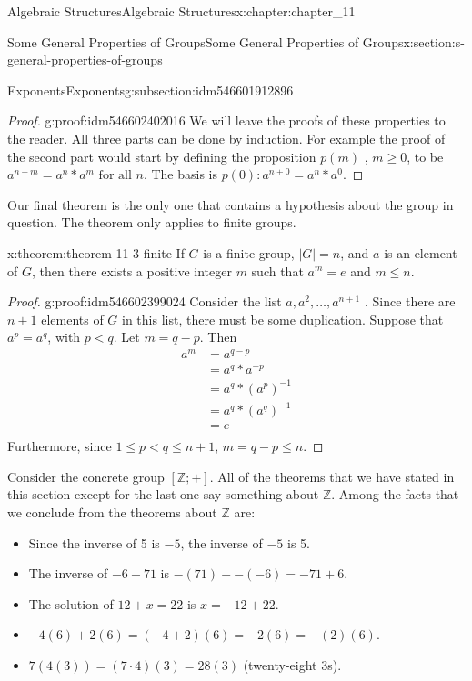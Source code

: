 \documentclass[oneside,10pt,]{book}
\numberwithin{equation}{section}
\begin{document}
\begin{chapterptx}{Algebraic Structures}{}{Algebraic Structures}{}{}{x:chapter:chapter_11}
\begin{sectionptx}{Some General Properties of Groups}{}{Some General Properties of Groups}{}{}{x:section:s-general-properties-of-groups}
\begin{subsectionptx}{Exponents}{}{Exponents}{}{}{g:subsection:idm546601912896}
\begin{proof}{}{g:proof:idm546602402016}
We will leave the proofs of these properties to the reader.  All three parts can be done by induction.  For example the proof of the second part would start by defining the proposition  \(p(m)\) , \(m\geq 0\), to be  \(a^{n+m}=a^n*a^m \textrm{ for all } n\).   The basis is \(p(0): a^{n+0}=a^n*a^0\).%
\end{proof}
Our final theorem is the only one that contains a hypothesis about the group in question. The theorem only applies to finite groups.%
\begin{theorem}{}{}{x:theorem:theorem-11-3-finite}%
If \(G\) is a finite group,  \(\left| G\right| = n\), and \(a\) is an element of \(G\), then there exists a positive integer \(m\) such that \(a^m= e\) and \(m\leq n\).%
\end{theorem}
\begin{proof}{}{g:proof:idm546602399024}
Consider the list \(a, a^2,\ldots , a^{n+1}\) . Since there are \(n + 1\) elements of \(G\) in this list, there must be some duplication.  Suppose that \(a^p=a^q\), with \(p < q\). Let \(m = q - p\).    Then%
\begin{equation*}
\begin{split}
a^m & =a^{q-p}\\
&= a^q*a^{-p}\\
&= a^q*\left(a^p\right)^{-1}\\
&= a^q *\left(a^q\right)^{-1}\\
&= e\\
\end{split}
\end{equation*}
Furthermore, since \(1\leq p < q \leq n+1\),   \(m= q-p\leq n\).%
\end{proof}
Consider the concrete group \([\mathbb{Z}; +]\). All of the theorems that we have stated in this section except for the last one say something about \(\mathbb{Z}\). Among the facts that we conclude from the theorems about \(\mathbb{Z}\) are:%
\begin{itemize}[label=\textbullet]
\item{}Since the inverse of 5 is \(-5\), the inverse of \(-5\) is 5.%
\item{}The inverse of \(-6 + 71\) is  \(-(71) + -(-6) = -71 + 6\).%
\item{}The solution of \(12 + x = 22\) is \(x = -12 + 22\).%
\item{}\(-4(6) + 2(6) = (-4 + 2)(6) = -2(6) = -(2)(6)\).%
\item{}\(7(4(3)) = (7\cdot 4)(3) = 28(3)\)  (twenty-eight 3s).%

\end{itemize}
\end{subsectionptx}
\end{sectionptx}
\end{chapterptx}
\end{document}
